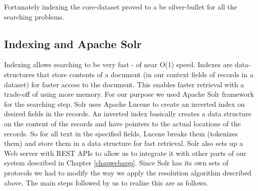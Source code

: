         Fortunately indexing the core-dataset proved to a be silver-bullet for all the searching problems.

\subsection{Indexing and Apache Solr}
        Indexing allows searching to be very fast - of near O(1) speed. Indexes are data-structures that store contents of a document (in our context fields of records in a dataset) for faster access to the document. This enables faster retrieval with a trade-off of using more memory. For our purpose we used Apache Solr framework \cite{solr} for the searching step. Solr uses Apache Lucene \cite{lucene} to create an inverted index on desired fields in the records. An inverted index basically creates a data structure on the content of the records and have pointers to the actual locations of the records. So for all text in the specified fields, Lucene breaks them (tokenizes them) and store them in a data structure for fast retrieval.  Solr also sets up a  Web server with REST APIs to allow us to integrate it with other parts of our system described in Chapter \ref{chapwebapp}. 
        Since Solr has its own sets of protocols we had to modify the way we apply the resolution algorithm described above. The main steps followed by us to realize this are as follows.\cite{solrdocs} 
